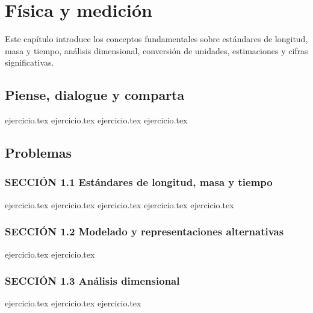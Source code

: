\chapter{Física y medición}
\label{cap:fisica_y_medicion}

Este capítulo introduce los conceptos fundamentales sobre estándares de longitud, masa y tiempo, análisis dimensional, conversión de unidades, estimaciones y cifras significativas.

\section*{Piense, dialogue y comparta}
\begin{enumerate}
    {ejercicio.tex}
    {ejercicio.tex}
    {ejercicio.tex}
    {ejercicio.tex}
\end{enumerate}

\section*{Problemas}

\subsection*{SECCIÓN 1.1 Estándares de longitud, masa y tiempo}
\begin{enumerate}
    {ejercicio.tex}
    {ejercicio.tex}
    {ejercicio.tex}
    {ejercicio.tex}
    {ejercicio.tex}
\end{enumerate}

\subsection*{SECCIÓN 1.2 Modelado y representaciones alternativas}
\begin{enumerate}
    \setcounter{enumi}{5}
    {ejercicio.tex}
    {ejercicio.tex}
\end{enumerate}

\subsection*{SECCIÓN 1.3 Análisis dimensional}
\begin{enumerate}
    \setcounter{enumi}{7}
    {ejercicio.tex}
    {ejercicio.tex}
    {ejercicio.tex}
\end{enumerate}

